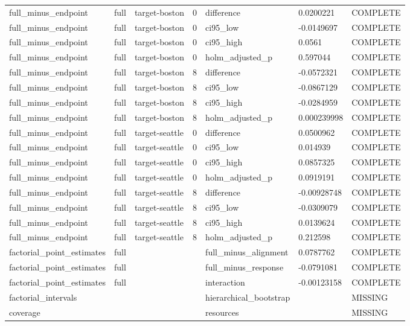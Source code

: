 \begin{longtable}{lllllll}
full\_minus\_endpoint & full & target-boston & 0 & difference & 0.0200221 & COMPLETE \\
full\_minus\_endpoint & full & target-boston & 0 & ci95\_low & -0.0149697 & COMPLETE \\
full\_minus\_endpoint & full & target-boston & 0 & ci95\_high & 0.0561 & COMPLETE \\
full\_minus\_endpoint & full & target-boston & 0 & holm\_adjusted\_p & 0.597044 & COMPLETE \\
full\_minus\_endpoint & full & target-boston & 8 & difference & -0.0572321 & COMPLETE \\
full\_minus\_endpoint & full & target-boston & 8 & ci95\_low & -0.0867129 & COMPLETE \\
full\_minus\_endpoint & full & target-boston & 8 & ci95\_high & -0.0284959 & COMPLETE \\
full\_minus\_endpoint & full & target-boston & 8 & holm\_adjusted\_p & 0.000239998 & COMPLETE \\
full\_minus\_endpoint & full & target-seattle & 0 & difference & 0.0500962 & COMPLETE \\
full\_minus\_endpoint & full & target-seattle & 0 & ci95\_low & 0.014939 & COMPLETE \\
full\_minus\_endpoint & full & target-seattle & 0 & ci95\_high & 0.0857325 & COMPLETE \\
full\_minus\_endpoint & full & target-seattle & 0 & holm\_adjusted\_p & 0.0919191 & COMPLETE \\
full\_minus\_endpoint & full & target-seattle & 8 & difference & -0.00928748 & COMPLETE \\
full\_minus\_endpoint & full & target-seattle & 8 & ci95\_low & -0.0309079 & COMPLETE \\
full\_minus\_endpoint & full & target-seattle & 8 & ci95\_high & 0.0139624 & COMPLETE \\
full\_minus\_endpoint & full & target-seattle & 8 & holm\_adjusted\_p & 0.212598 & COMPLETE \\
factorial\_point\_estimates & full &  &  & full\_minus\_alignment & 0.0787762 & COMPLETE \\
factorial\_point\_estimates & full &  &  & full\_minus\_response & -0.0791081 & COMPLETE \\
factorial\_point\_estimates & full &  &  & interaction & -0.00123158 & COMPLETE \\
factorial\_intervals &  &  &  & hierarchical\_bootstrap &  & MISSING \\
coverage &  &  &  & resources &  & MISSING \\
\bottomrule
\end{longtable}
